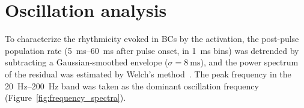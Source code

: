 \section{Oscillation analysis}\label{sec:oscillation_analysis}

To characterize the rhythmicity evoked in BCs by the activation, the post-pulse population rate (\SIrange{5}{60}{\milli\second}
after pulse onset, in \SI{1}{\milli\second} bins) was detrended by subtracting a Gaussian-smoothed envelope ($\sigma =
\SI{8}{\milli\second}$), and the power spectrum of the residual was estimated by Welch's method~\parencite{welchUse1967}. The peak
frequency in the \SIrange{20}{200}{\hertz} band was taken as the dominant oscillation frequency
(Figure~\ref{fig:frequency_spectra}).

